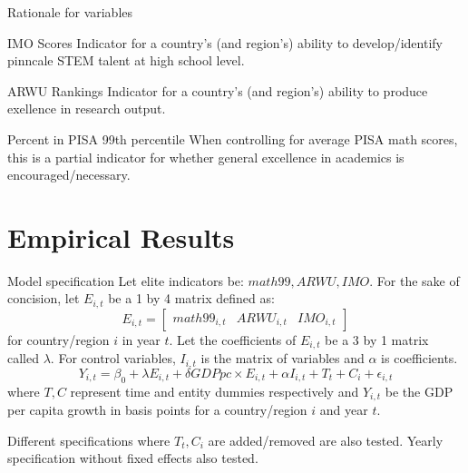 \documentclass[10pt]{beamer}
\begin{document}
\begin{frame}{Rationale for variables}
    \begin{block}{IMO Scores}
        Indicator for a country's (and region's) ability to develop/identify pinncale STEM talent at high school level.
    \end{block}

    \begin{block}{ARWU Rankings}
        Indicator for a country's (and region's) ability to produce exellence in research output.
    \end{block}

    \begin{block}{Percent in PISA 99th percentile}
        When controlling for average PISA math scores, this is a partial indicator for whether general excellence in academics is encouraged/necessary.
    \end{block}
\end{frame}

\section{Empirical Results}
\begin{frame}{Model specification}
    Let elite indicators be: $math99, ARWU, IMO$.
    For the sake of concision, let $E_{i,t}$ be a 1 by 4 matrix defined as:
    \[E_{i,t} = 
    \begin{bmatrix}
        math99_{i, t} & ARWU_{i, t} & IMO_{i, t}
    \end{bmatrix}
    \] for country/region $i$ in year $t$.
    Let the coefficients of $E_{i, t}$ be a 3 by 1 matrix called $\lambda$. For control variables, $I_{i, t}$ is the matrix of variables and $\alpha$ is coefficients.
    \begin{equation}
        Y_{i, t} = \beta_0 + \lambda E_{i, t} + \delta GDPpc \times E_{i,t} + \alpha I_{i, t} + T_t + C_i + \epsilon_{i, t}
    \end{equation}
    where $T,C$ represent time and entity dummies respectively and $Y_{i,t}$ be the GDP per capita growth in basis points for a country/region $i$ and year $t$.
    
    Different specifications where $T_t, C_i$ are added/removed are also tested. Yearly specification without fixed effects also tested.
\end{frame}
\end{document}
